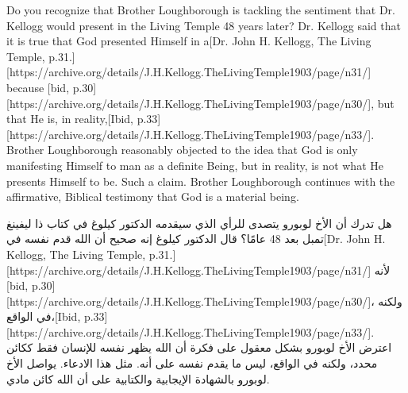 Do you recognize that Brother Loughborough is tackling the sentiment that Dr. Kellogg would present in the Living Temple 48 years later? Dr. Kellogg said that it is true that God presented Himself in a[Dr. John H. Kellogg, The Living Temple, p.31.][https://archive.org/details/J.H.Kellogg.TheLivingTemple1903/page/n31/] because [bid, p.30][https://archive.org/details/J.H.Kellogg.TheLivingTemple1903/page/n30/], but that He is, in reality,[Ibid, p.33][https://archive.org/details/J.H.Kellogg.TheLivingTemple1903/page/n33/]. Brother Loughborough reasonably objected to the idea that God is only manifesting Himself to man as a definite Being, but in reality, is not what He presents Himself to be. Such a claim. Brother Loughborough continues with the affirmative, Biblical testimony that God is a material being.


هل تدرك أن الأخ لوبورو يتصدى للرأي الذي سيقدمه الدكتور كيلوغ في كتاب ذا ليفينغ تمبل بعد 48 عامًا؟ قال الدكتور كيلوغ إنه صحيح أن الله قدم نفسه في[Dr. John H. Kellogg, The Living Temple, p.31.][https://archive.org/details/J.H.Kellogg.TheLivingTemple1903/page/n31/] لأنه [bid, p.30][https://archive.org/details/J.H.Kellogg.TheLivingTemple1903/page/n30/]، ولكنه في الواقع،[Ibid, p.33][https://archive.org/details/J.H.Kellogg.TheLivingTemple1903/page/n33/]. اعترض الأخ لوبورو بشكل معقول على فكرة أن الله يظهر نفسه للإنسان فقط ككائن محدد، ولكنه في الواقع، ليس ما يقدم نفسه على أنه. مثل هذا الادعاء. يواصل الأخ لوبورو بالشهادة الإيجابية والكتابية على أن الله كائن مادي.


